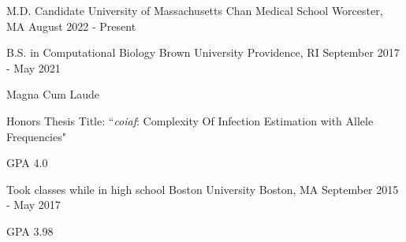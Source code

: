 
\begin{cventries}

  \cventry
  {M.D. Candidate} %
  {University of Massachusetts Chan Medical School} %
  {Worcester, MA} %
  {August 2022 - Present} %
  {}

  \cventry
  {B.S. in Computational Biology} %
  {Brown University} %
  {Providence, RI} %
  {September 2017 - May 2021} %
  {
    \begin{cvitems}
    \item {Magna Cum Laude}
    \item{Honors Thesis Title: ``\textit{coiaf}: Complexity Of Infection
      Estimation with Allele Frequencies"}
    \item {GPA 4.0}
    \end{cvitems}
  }

  \cventry
  {Took classes while in high school} %
  {Boston University} %
  {Boston, MA} %
  {September 2015 - May 2017} %
  {
    \begin{cvitems}
    \item {GPA 3.98}
    \end{cvitems}
  }

\end{cventries}
